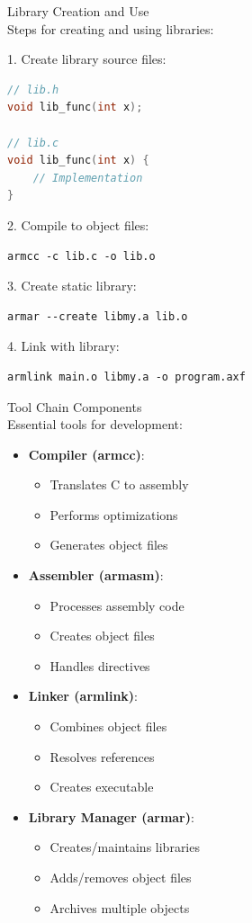 \begin{KR}{Library Creation and Use}\\
Steps for creating and using libraries:

1. Create library source files:
\begin{lstlisting}[language=C, style=base]
// lib.h
void lib_func(int x);

// lib.c
void lib_func(int x) {
    // Implementation
}
\end{lstlisting}

2. Compile to object files:
\begin{lstlisting}[style=base]
armcc -c lib.c -o lib.o
\end{lstlisting}

3. Create static library:
\begin{lstlisting}[style=base]
armar --create libmy.a lib.o
\end{lstlisting}

4. Link with library:
\begin{lstlisting}[style=base]
armlink main.o libmy.a -o program.axf
\end{lstlisting}
\end{KR}

\begin{concept}{Tool Chain Components}\\
Essential tools for development:
\begin{itemize}
  \item \textbf{Compiler (armcc)}:
    \begin{itemize}
      \item Translates C to assembly
      \item Performs optimizations
      \item Generates object files
    \end{itemize}
  \item \textbf{Assembler (armasm)}:
    \begin{itemize}
      \item Processes assembly code
      \item Creates object files
      \item Handles directives
    \end{itemize}
  \item \textbf{Linker (armlink)}:
    \begin{itemize}
      \item Combines object files
      \item Resolves references
      \item Creates executable
    \end{itemize}
  \item \textbf{Library Manager (armar)}:
    \begin{itemize}
      \item Creates/maintains libraries
      \item Adds/removes object files
      \item Archives multiple objects
    \end{itemize}
\end{itemize}
\end{concept}

